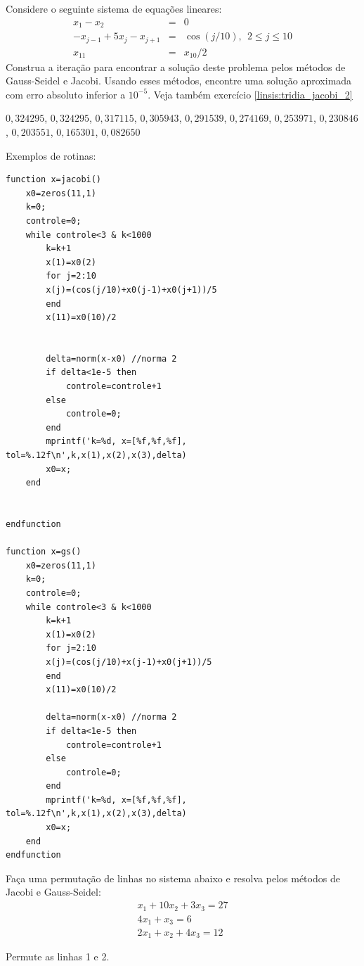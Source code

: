 \begin{exer}\label{linsis:tridia_jacobi_1} Considere o seguinte sistema de equações lineares:
\begin{eqnarray}
x_1-x_2&=&0\nonumber\\
-x_{j-1}+5x_j-x_{j+1}&=&\cos(j/10),~~ 2\leq j \leq 10\nonumber\\
x_{11}&=&x_{10}/2
\end{eqnarray}
Construa a iteração para encontrar a solução deste problema pelos métodos de Gauss-Seidel e Jacobi. Usando esses métodos, encontre uma solução aproximada com erro absoluto inferior a $10^{-5}$. Veja também exercício \ref{linsis:tridia_jacobi_2}
\end{exer}
\begin{resp}
  
$0,324295$, $0,324295$, $0,317115$, $0,305943$, $0,291539$, $0,274169$, $0,253971$, $0,230846$, $0,203551$, $0,165301$, $0,082650$

\ifisscilab
Exemplos de rotinas:
\begin{verbatim}
function x=jacobi()
    x0=zeros(11,1)
    k=0;
    controle=0;
    while controle<3 & k<1000
        k=k+1
        x(1)=x0(2)
        for j=2:10
        x(j)=(cos(j/10)+x0(j-1)+x0(j+1))/5
        end
        x(11)=x0(10)/2


        delta=norm(x-x0) //norma 2
        if delta<1e-5 then
            controle=controle+1
        else
            controle=0;
        end
        mprintf('k=%d, x=[%f,%f,%f], tol=%.12f\n',k,x(1),x(2),x(3),delta)
        x0=x;
    end


endfunction

function x=gs()
    x0=zeros(11,1)
    k=0;
    controle=0;
    while controle<3 & k<1000
        k=k+1
        x(1)=x0(2)
        for j=2:10
        x(j)=(cos(j/10)+x(j-1)+x0(j+1))/5
        end
        x(11)=x0(10)/2

        delta=norm(x-x0) //norma 2
        if delta<1e-5 then
            controle=controle+1
        else
            controle=0;
        end
        mprintf('k=%d, x=[%f,%f,%f], tol=%.12f\n',k,x(1),x(2),x(3),delta)
        x0=x;
    end
endfunction
\end{verbatim}    
\fi
  
\end{resp}

\begin{exer} Faça uma permutação de linhas no sistema abaixo e resolva pelos métodos de Jacobi e Gauss-Seidel:
\begin{eqnarray*}
x_1+10x_2+3x_3=27\\
4x_1+x_3=6\\
2x_1+x_2+4x_3=12
\end{eqnarray*}
\end{exer}
\begin{resp}
  
    Permute as linhas 1 e 2.    
  
\end{resp}


